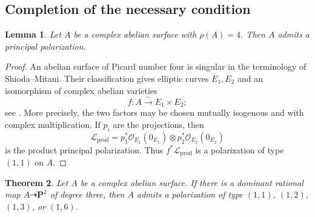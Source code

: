 \documentclass[12pt]{amsart}
\numberwithin{equation}{section}
\newtheorem{theorem}{Theorem}[section]
\newtheorem{lemma}[theorem]{Lemma}
\theoremstyle{definition}
\theoremstyle{remark}
\newcommand{\PP}{\mathbf P}
\newcommand{\cO}{\mathcal O}
\newcommand{\cL}{\mathcal L}
\begin{document}



\subsection{Completion of the necessary condition}

\begin{lemma}\label{lem:rho-four-principal}
Let \(A\) be a complex abelian surface with \(\rho(A)=4\).  Then \(A\)
admits a principal polarization.
\end{lemma}

\begin{proof}
An abelian surface of Picard number four is singular in the terminology
of Shioda--Mitani.  Their classification gives elliptic curves
\(E_1,E_2\) and an isomorphism of complex abelian varieties
\[
                         f:A\xrightarrow{\sim}E_1\times E_2;
\]
see \cite[p.~259 and Theorem~3.1]{ShiodaMitani}.  More precisely,
the two factors may be chosen mutually isogenous and with complex
multiplication.  If \(p_i\) are the projections, then
\[
 \cL_{\mathrm{prod}}
 =p_1^*\cO_{E_1}(0_{E_1})\otimes
  p_2^*\cO_{E_2}(0_{E_2})
\]
is the product principal polarization.  Thus
\(f^*\cL_{\mathrm{prod}}\) is a polarization of type \((1,1)\) on
\(A\).
\end{proof}

\begin{theorem}\label{thm:necessary}
Let \(A\) be a complex abelian surface.  If there is a dominant
rational map \(A\dashrightarrow\PP^2\) of degree three, then \(A\)
admits a polarization of type \((1,1)\), \((1,2)\), \((1,3)\), or
\((1,6)\).
\end{theorem}
\end{document}
